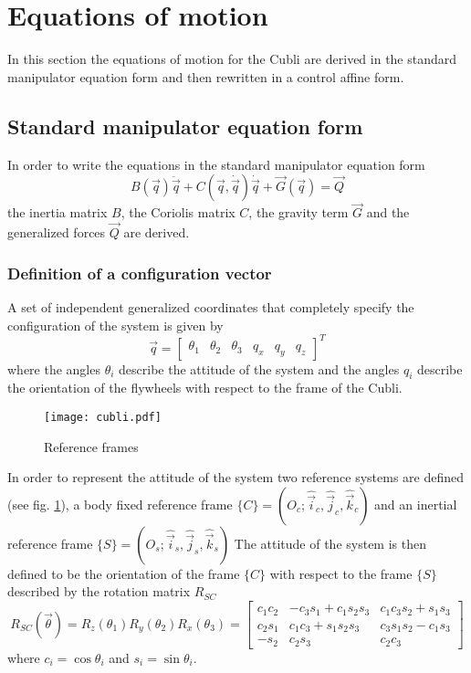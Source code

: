 \section{Equations of motion}
In this section the equations of motion for the Cubli are derived in the standard
manipulator equation form and then rewritten in a control affine form.

\subsection{Standard manipulator equation form}
In order to write the equations in the standard manipulator equation form
\begin{equation}
  \label{eq:smform}
  B(\vec{q}) \ddot{\vec{q}} + C(\vec{q}, \dot{\vec{q}}) \dot{\vec{q}} + \vec{G}(\vec{q}) = \vec{Q}
\end{equation}
the inertia matrix $B$, the Coriolis matrix $C$, the gravity term $\vec{G}$ and the generalized forces
$\vec{Q}$ are derived.

\subsubsection{Definition of a configuration vector}
A set of independent generalized coordinates that completely specify the configuration
of the system is given by
\[
\vec{q} =
\begin{bmatrix}
  \theta_{1} & \theta_{2} & \theta_{3} & q_{x} & q_{y} & q_{z}
\end{bmatrix}^T
\]
where the angles $\theta_i$ describe the attitude of the system and
the angles $q_i$ describe the orientation of the flywheels with respect
to the frame of the Cubli.
\par
\begin{figure}[h]
  \centering
  \texttt{[image: cubli.pdf]}
  \caption{Reference frames \label{fig:frames}}
\end{figure}
In order to represent the attitude of the system two reference systems are defined
(see fig. \ref{fig:frames}), a body fixed reference frame
$\{C\} = (O_c; \hat{\vec{i}}_c, \hat{\vec{j}}_c, \hat{\vec{k}}_c)$
and an inertial reference frame $\{S\} = (O_s; \hat{\vec{i}}_s, \hat{\vec{j}}_s, \hat{\vec{k}}_s)$
The attitude of the system is then defined to be the orientation of the frame $\{C\}$
with respect to the frame $\{S\}$ described by the rotation matrix
$R_{SC}$
\[
R_{SC}(\vec{\theta}) = R_z(\theta_1)R_y(\theta_2)R_x(\theta_3)
=
\begin{bmatrix}
  c_1 c_2 & -c_3 s_1 + c_1 s_2 s_3 & c_1 c_3 s_2 + s_1 s_3 \\
  c_2 s_1 & c_1 c_3 + s_1 s_2 s_3 & c_3 s_1 s_2 - c_1 s_3 \\
  -s_2 & c_2 s_3 & c_2 c_3
\end{bmatrix}
\]
where $c_i = \cos{\theta_i}$ and $s_i = \sin{\theta_i}$.


